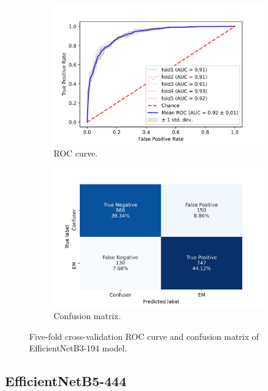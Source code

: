 \begin{figure}[h!]
	\centering
	\begin{subfigure}[b]{0.49\textwidth}
		\centering
		\includegraphics[width=\textwidth,keepaspectratio]{images/Supplement4/image188.png}
		\caption{ROC curve.}
	\end{subfigure}
	\hfill
	\begin{subfigure}[b]{0.49\textwidth}
		\centering
		\includegraphics[width=\textwidth,keepaspectratio]{images/Supplement4/image194.png}
		\caption{Confusion matrix.}
	\end{subfigure}
	\caption{Five-fold cross-validation ROC curve and confusion matrix of EfficientNetB3-194 model.}
\end{figure}

\vfill\clearpage
\subsection{EfficientNetB5-444}

